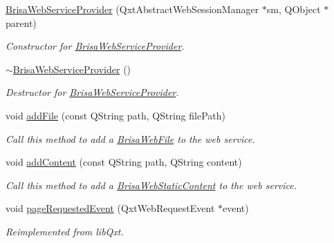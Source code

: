 \begin{DoxyCompactItemize}
\item 
\hyperlink{classBrisaCore_1_1BrisaWebServiceProvider_adccc1ffe600411cd23ea2c3524711bfb}{BrisaWebServiceProvider} (QxtAbstractWebSessionManager $\ast$sm, QObject $\ast$parent)
\begin{DoxyCompactList}\small\item\em Constructor for \hyperlink{classBrisaCore_1_1BrisaWebServiceProvider}{BrisaWebServiceProvider}. \item\end{DoxyCompactList}\item 
\hyperlink{classBrisaCore_1_1BrisaWebServiceProvider_ae209fc22681c21cfc2745b6f177fe78f}{$\sim$BrisaWebServiceProvider} ()
\begin{DoxyCompactList}\small\item\em Destructor for \hyperlink{classBrisaCore_1_1BrisaWebServiceProvider}{BrisaWebServiceProvider}. \item\end{DoxyCompactList}\item 
void \hyperlink{classBrisaCore_1_1BrisaWebServiceProvider_a2732014aacccc107547a651499482011}{addFile} (const QString path, QString filePath)
\begin{DoxyCompactList}\small\item\em Call this method to add a \hyperlink{classBrisaCore_1_1BrisaWebFile}{BrisaWebFile} to the web service. \item\end{DoxyCompactList}\item 
void \hyperlink{classBrisaCore_1_1BrisaWebServiceProvider_a916815911d9293464bf7a2545f46cbfd}{addContent} (const QString path, QString content)
\begin{DoxyCompactList}\small\item\em Call this method to add a \hyperlink{classBrisaCore_1_1BrisaWebStaticContent}{BrisaWebStaticContent} to the web service. \item\end{DoxyCompactList}\item 
void \hyperlink{classBrisaCore_1_1BrisaWebServiceProvider_a21fbddc4ca395a0da441602857ae493e}{pageRequestedEvent} (QxtWebRequestEvent $\ast$event)
\begin{DoxyCompactList}\small\item\em Reimplemented from libQxt. \item\end{DoxyCompactList}\end{DoxyCompactItemize}
